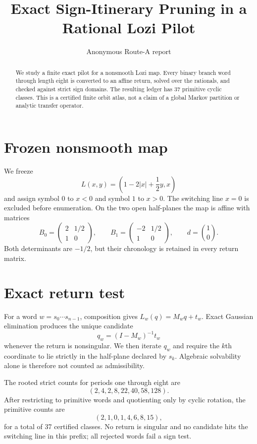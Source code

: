 \documentclass[10pt]{article}
\title{Exact Sign-Itinerary Pruning in a Rational Lozi Pilot}
\author{Anonymous Route-A report}
\date{}
\begin{document}
\maketitle
\begin{abstract}
We study a finite exact pilot for a nonsmooth Lozi map.  Every binary branch
word through length eight is converted to an affine return, solved over the
rationals, and checked against strict sign domains.  The resulting ledger has
37 primitive cyclic classes.  This is a certified finite orbit atlas, not a
claim of a global Markov partition or analytic transfer operator.
\end{abstract}

\section{Frozen nonsmooth map}
We freeze
\[
 L(x,y)=\left(1-2|x|+\frac12y,x\right)
\]
and assign symbol $0$ to $x<0$ and symbol $1$ to $x>0$.  The switching line
$x=0$ is excluded before enumeration.  On the two open half-planes the map is
affine with matrices
\[
 B_0=\begin{pmatrix}2&1/2\\1&0\end{pmatrix},\qquad
 B_1=\begin{pmatrix}-2&1/2\\1&0\end{pmatrix},
 \qquad d=\binom10.
\]
Both determinants are $-1/2$, but their chronology is retained in every
return matrix.

\section{Exact return test}
For a word $w=s_0\cdots s_{n-1}$, composition gives
$L_w(q)=M_wq+t_w$.  Exact Gaussian elimination produces the unique candidate
\[
 q_w=(I-M_w)^{-1}t_w
\]
whenever the return is nonsingular.  We then iterate $q_w$ and require the
$k$th coordinate to lie strictly in the half-plane declared by $s_k$.
Algebraic solvability alone is therefore not counted as admissibility.

The rooted strict counts for periods one through eight are
\[
 (2,4,2,8,22,40,58,128).
\]
After restricting to primitive words and quotienting only by cyclic rotation,
the primitive counts are
\[
 (2,1,0,1,4,6,8,15),
\]
for a total of 37 certified classes.  No return is singular and no candidate
hits the switching line in this prefix; all rejected words fail a sign test.
\end{document}
